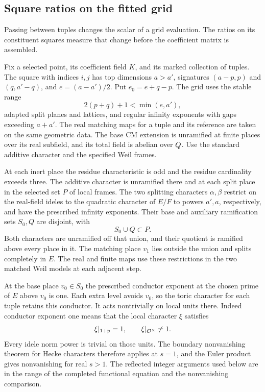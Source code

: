 \subsection{Square ratios on the fitted grid}
\label{subsec:fitted-square-ratios}

Passing between tuples changes the scalar of a grid evaluation. The ratios on its constituent squares measure that change before the coefficient matrix is assembled.

Fix a selected point, its coefficient field \(K\), and its
marked collection of tuples. The square with indices \(i,j\)
has top dimensions \(a>a'\), signatures \((a-p,p)\) and
\((q,a'-q)\), and \(e=(a-a')/2\). Put \(e_0=e+q-p\).
The grid uses the stable range 
\[
  2(p+q)+1<\min(e,a'),
\]
adapted split planes and lattices, and regular infinity
exponents with gaps exceeding \(a+a'\). The real matching
maps for a tuple and its reference are taken on the same
geometric data. The base CM extension is unramified at
finite places over its real subfield, and its total field
is abelian over \(Q\). Use the standard additive character
and the specified Weil frames.

At each inert place the
residue characteristic is odd and the residue cardinality
exceeds three. The additive character is unramified there
and at each split place in the selected set \(P\) of local
frames. The two splitting characters \(\alpha,\beta\) restrict
on the real-field ideles to the quadratic character of
\(E/F\) to powers \(a',a\), respectively, and have the prescribed
infinity exponents. Their base and auxiliary ramification
sets \(S_0,Q\) are disjoint, with 
\[
  S_0\cup Q\subset P.
\]
Both characters are unramified off that union, and their quotient
is ramified above every place in it. The matching place
\(v_1\) lies outside the union and splits completely in
\(E\). The real and finite maps use these restrictions in the
two matched Weil models at each adjacent step.

At the base place
\(v_0\in S_0\) the prescribed conductor exponent at the chosen
prime of \(E\) above \(v_0\) is one. Each extra level avoids
\(v_0\), so the toric character for each tuple retains this
conductor. It acts nontrivially on local units there.
Indeed conductor exponent one means that the local character \(\xi\) satisfies
\[
  \xi|_{1+\mathfrak p}=1,\qquad \xi|_{{\cal O}^{\times}}\ne1 .
\]
 Every
idele norm power is trivial on those units. The boundary
nonvanishing theorem for Hecke characters therefore applies at
\(s=1\), and the Euler product gives nonvanishing for real
\(s>1\). The reflected integer arguments used below are in the
range of the completed functional equation and the nonvanishing
comparison. \label{cor:fitted-square-ratios-1}

